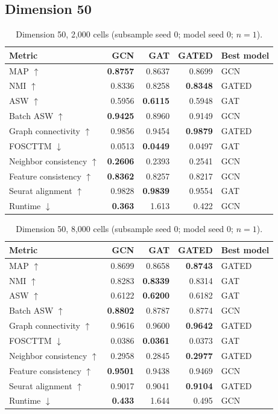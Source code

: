 \documentclass[10pt]{article}
\begin{document}
\subsection{Dimension 50}
\begin{table}[H]\centering\small
\caption{Dimension 50, 2,000 cells (subsample seed 0; model seed 0; $n=1$).}
\begin{tabular}{@{}lrrrl@{}}\toprule
Metric & GCN & GAT & GATED & Best model \\\midrule
MAP $\uparrow$ & \textbf{0.8757} & 0.8637 & 0.8699 & GCN \\
NMI $\uparrow$ & 0.8336 & 0.8258 & \textbf{0.8348} & GATED \\
ASW $\uparrow$ & 0.5956 & \textbf{0.6115} & 0.5948 & GAT \\
Batch ASW $\uparrow$ & \textbf{0.9425} & 0.8960 & 0.9149 & GCN \\
Graph connectivity $\uparrow$ & 0.9856 & 0.9454 & \textbf{0.9879} & GATED \\
FOSCTTM $\downarrow$ & 0.0513 & \textbf{0.0449} & 0.0497 & GAT \\
Neighbor consistency $\uparrow$ & \textbf{0.2606} & 0.2393 & 0.2541 & GCN \\
Feature consistency $\uparrow$ & \textbf{0.8362} & 0.8257 & 0.8217 & GCN \\
Seurat alignment $\uparrow$ & 0.9828 & \textbf{0.9839} & 0.9554 & GAT \\
Runtime $\downarrow$ & \textbf{0.363} & 1.613 & 0.422 & GCN \\
\bottomrule\end{tabular}
\end{table}
\begin{table}[H]\centering\small
\caption{Dimension 50, 8,000 cells (subsample seed 0; model seed 0; $n=1$).}
\begin{tabular}{@{}lrrrl@{}}\toprule
Metric & GCN & GAT & GATED & Best model \\\midrule
MAP $\uparrow$ & 0.8699 & 0.8658 & \textbf{0.8743} & GATED \\
NMI $\uparrow$ & 0.8283 & \textbf{0.8339} & 0.8314 & GAT \\
ASW $\uparrow$ & 0.6122 & \textbf{0.6200} & 0.6182 & GAT \\
Batch ASW $\uparrow$ & \textbf{0.8802} & 0.8787 & 0.8774 & GCN \\
Graph connectivity $\uparrow$ & 0.9616 & 0.9600 & \textbf{0.9642} & GATED \\
FOSCTTM $\downarrow$ & 0.0386 & \textbf{0.0361} & 0.0373 & GAT \\
Neighbor consistency $\uparrow$ & 0.2958 & 0.2845 & \textbf{0.2977} & GATED \\
Feature consistency $\uparrow$ & \textbf{0.9501} & 0.9438 & 0.9469 & GCN \\
Seurat alignment $\uparrow$ & 0.9017 & 0.9041 & \textbf{0.9104} & GATED \\
Runtime $\downarrow$ & \textbf{0.433} & 1.644 & 0.495 & GCN \\
\bottomrule\end{tabular}
\end{table}
\end{document}
